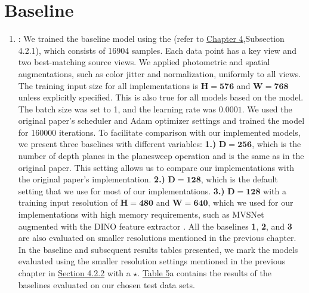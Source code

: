 \section{Baseline}\label{sec:exp-baseline}
\begin{enumerate}
    \item \textbf{\mvsn}: We trained the baseline {\mvsn} model using the {\bms} (refer to \hyperref[subsec:train-data-var]{Chapter 4},{Subsection 4.2.1}), which consists of 16904 samples. Each data point has a key view and two best-matching source views. We applied photometric and spatial augmentations, such as color jitter and normalization, uniformly to all views. The training input size for all implementations is $\mathbf{H=576}$ and $\mathbf{W=768}$ unless explicitly specified. This is also true for all models based on the {\mvsn} model. The batch size was set to 1, and the learning rate was $0.0001$. We used the original paper's scheduler and Adam optimizer settings and trained the model for 160000 iterations. To facilitate comparison with our implemented models, we present three baselines with different variables: \textbf{1.)} $\mathbf{D=256}$, which is the number of depth planes in the planesweep operation and is the same as in the original paper. This setting allows us to compare our implementations with the original paper's implementation. \textbf{2.)} $\mathbf{D=128}$, which is the default setting that we use for most of our implementations. \textbf{3.)} $\mathbf{D=128}$ with a training input resolution of $\mathbf{H=480}$ and $\mathbf{W=640}$, which we used for our implementations with high memory requirements, such as MVSNet augmented with the DINO feature extractor \cite{amir2021deep}. All the baselines \textbf{1}, \textbf{2}, and \textbf{3} are also evaluated on smaller resolutions mentioned in the previous chapter. In the baseline and subsequent results tables presented, we mark the models evaluated using the smaller resolution settings mentioned in the previous chapter in \hyperref[subsec:test-dataset-params]{Section 4.2.2} with a \(\star\). \hyperref[tab:baseline]{Table 5}{a} contains the results of the {\mvsn} baselines evaluated on our chosen test data sets.


\end{enumerate}

